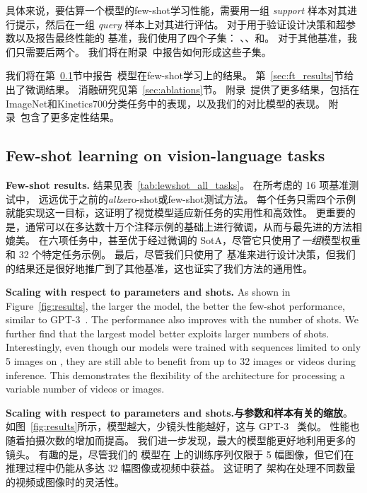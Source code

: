 具体来说，要估算一个模型的few-shot学习性能，需要用一组 \emph{support} 样本对其进行提示，然后在一组 \emph{query} 样本上对其进行评估。
对于用于验证设计决策和超参数以及报告最终性能的 \dev{} 基准，我们使用了四个子集：
\metadevsupportshort{}、\metadevqueryshort{}、\metatestsupportshort{}和\metatestqueryshort{}。
对于其他基准，我们只需要后两个。
我们将在附录~中报告如何形成这些子集。

我们将在第~\ref{sec:fewshot_openended}节中报告~\method{}模型在few-shot学习上的结果。
第~\ref{sec:ft_results}节给出了微调结果。
消融研究见第~\ref{sec:ablations}节。
附录~提供了更多结果，包括\method{}在ImageNet和Kinetics700分类任务中的表现，以及我们的对比模型的表现。
附录~包含了更多定性结果。





\subsection{Few-shot learning on vision-language tasks}
\label{sec:fewshot_openended}




\textbf{Few-shot results.}
结果见表~\ref{tab:lewshot_all_tasks}。
\largem{}在所考虑的 16 项基准测试中，\largem{} 远远优于之前的\emph{all}zero-shot或few-shot测试方法。
每个任务只需四个示例就能实现这一目标，这证明了视觉模型适应新任务的实用性和高效性。
更重要的是，\largem{}通常可以在多达数十万个注释示例的基础上进行微调，从而与最先进的方法相媲美。
在六项任务中，\largem{}甚至优于经过微调的 SotA，尽管它只使用了\emph{一组}模型权重和 32 个特定任务示例。
最后，尽管我们只使用了 \dev{} 基准来进行设计决策，但我们的结果还是很好地推广到了其他基准，这也证实了我们方法的通用性。


\textbf{Scaling with respect to parameters and shots.}
As shown in Figure~\ref{fig:results}, the larger the model, the better the few-shot performance, similar to GPT-3~\citep{gpt3}.
The performance also improves with the number of shots.
We further find that the largest model better exploits larger numbers of shots.
Interestingly, even though our \method{} models were trained with sequences limited to only 5 images on \mmmw{}, they are still able to benefit from up to 32 images or videos during inference.
This demonstrates the flexibility of the \method{} architecture for processing a variable number of videos or images.

\textbf{Scaling with respect to parameters and shots.与参数和样本有关的缩放}。
如图~\ref{fig:results}所示，模型越大，少镜头性能越好，这与 GPT-3~\citep{gpt3} 类似。
性能也随着拍摄次数的增加而提高。
我们进一步发现，最大的模型能更好地利用更多的镜头。
有趣的是，尽管我们的 \method{}模型在 \mmmw{}上的训练序列仅限于 5 幅图像，但它们在推理过程中仍能从多达 32 幅图像或视频中获益。
这证明了 \method{} 架构在处理不同数量的视频或图像时的灵活性。


